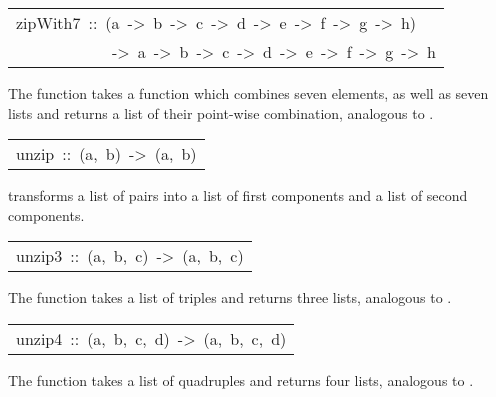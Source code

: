 \begin{haddockdesc}
\item[\begin{tabular}{@{}l}
zipWith7\ ::\ (a\ ->\ b\ ->\ c\ ->\ d\ ->\ e\ ->\ f\ ->\ g\ ->\ h)\\\ \ \ \ \ \ \ \ \ \ \ \ ->\ {\char 91}a{\char 93}\ ->\ {\char 91}b{\char 93}\ ->\ {\char 91}c{\char 93}\ ->\ {\char 91}d{\char 93}\ ->\ {\char 91}e{\char 93}\ ->\ {\char 91}f{\char 93}\ ->\ {\char 91}g{\char 93}\ ->\ {\char 91}h{\char 93}
\end{tabular}]\haddockbegindoc
The  function takes a function which combines seven
 elements, as well as seven lists and returns a list of their point-wise
 combination, analogous to .
\par

\end{haddockdesc}
\begin{haddockdesc}
\item[\begin{tabular}{@{}l}
unzip\ ::\ {\char 91}(a,\ b){\char 93}\ ->\ ({\char 91}a{\char 93},\ {\char 91}b{\char 93})
\end{tabular}]\haddockbegindoc
{} transforms a list of pairs into a list of first components
 and a list of second components.
\par

\end{haddockdesc}
\begin{haddockdesc}
\item[\begin{tabular}{@{}l}
unzip3\ ::\ {\char 91}(a,\ b,\ c){\char 93}\ ->\ ({\char 91}a{\char 93},\ {\char 91}b{\char 93},\ {\char 91}c{\char 93})
\end{tabular}]\haddockbegindoc
The  function takes a list of triples and returns three
 lists, analogous to .
\par

\end{haddockdesc}
\begin{haddockdesc}
\item[\begin{tabular}{@{}l}
unzip4\ ::\ {\char 91}(a,\ b,\ c,\ d){\char 93}\ ->\ ({\char 91}a{\char 93},\ {\char 91}b{\char 93},\ {\char 91}c{\char 93},\ {\char 91}d{\char 93})
\end{tabular}]\haddockbegindoc
The  function takes a list of quadruples and returns four
 lists, analogous to .
\par

\end{haddockdesc}
